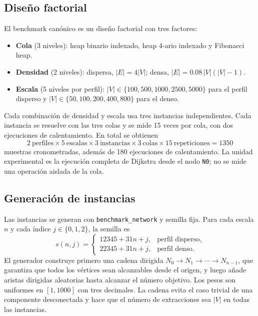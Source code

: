 \subsection{Diseño factorial}
El benchmark canónico es un diseño factorial con tres factores:
\begin{itemize}
    \item \textbf{Cola} (3 niveles): heap binario indexado, heap 4-ario indexado y Fibonacci heap.
    \item \textbf{Densidad} (2 niveles): dispersa, $|E|=4|V|$; densa, $|E|=0.08\,|V|(|V|-1)$.
    \item \textbf{Escala} (5 niveles por perfil): $|V|\in\{100,500,1000,2500,5000\}$ para el perfil disperso y $|V|\in\{50,100,200,400,800\}$ para el denso.
\end{itemize}
Cada combinación de densidad y escala usa tres instancias independientes. Cada instancia se resuelve con las tres colas y se mide 15 veces por cola, con dos ejecuciones de calentamiento. En total se obtienen
\begin{equation}
    2\ \text{perfiles}\times 5\ \text{escalas}\times 3\ \text{instancias}\times 3\ \text{colas}\times 15\ \text{repeticiones}=1350
    \label{eq:muestras}
\end{equation}
muestras cronometradas, además de 180 ejecuciones de calentamiento. La unidad experimental es la ejecución completa de Dijkstra desde el nodo \texttt{N0}; no se mide una operación aislada de la cola.

\subsection{Generación de instancias}
Las instancias se generan con \texttt{benchmark\_network} y semilla fija. Para cada escala $n$ y cada índice $j\in\{0,1,2\}$, la semilla es
\begin{equation}
    s(n,j)=\begin{cases}
        12345+31n+j, & \text{perfil disperso},\\
        22345+31n+j, & \text{perfil denso}.
    \end{cases}
    \label{eq:semillas}
\end{equation}
El generador construye primero una cadena dirigida $N_0\to N_1\to\cdots\to N_{n-1}$, que garantiza que todos los vértices sean alcanzables desde el origen, y luego añade aristas dirigidas aleatorias hasta alcanzar el número objetivo. Los pesos son uniformes en $[1,1000]$ con tres decimales. La cadena evita el caso trivial de una componente desconectada y hace que el número de extracciones sea $|V|$ en todas las instancias.

